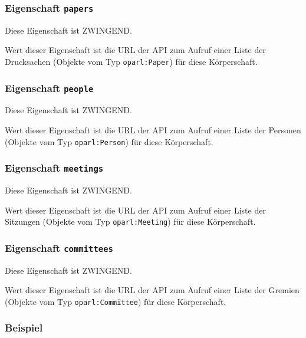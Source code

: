 \documentclass[,a4paper]{article}
\begin{document}
\subsubsection{Eigenschaft \texttt{papers}}

Diese Eigenschaft ist ZWINGEND.

Wert dieser Eigenschaft ist die URL der API zum Aufruf einer Liste der
Drucksachen (Objekte vom Typ \texttt{oparl:Paper}) für diese
Körperschaft.

\subsubsection{Eigenschaft \texttt{people}}

Diese Eigenschaft ist ZWINGEND.

Wert dieser Eigenschaft ist die URL der API zum Aufruf einer Liste der
Personen (Objekte vom Typ \texttt{oparl:Person}) für diese Körperschaft.

\subsubsection{Eigenschaft \texttt{meetings}}

Diese Eigenschaft ist ZWINGEND.

Wert dieser Eigenschaft ist die URL der API zum Aufruf einer Liste der
Sitzungen (Objekte vom Typ \texttt{oparl:Meeting}) für diese
Körperschaft.

\subsubsection{Eigenschaft \texttt{committees}}

Diese Eigenschaft ist ZWINGEND.

Wert dieser Eigenschaft ist die URL der API zum Aufruf einer Liste der
Gremien (Objekte vom Typ \texttt{oparl:Committee}) für diese
Körperschaft.

\subsubsection{Beispiel}
\end{document}
